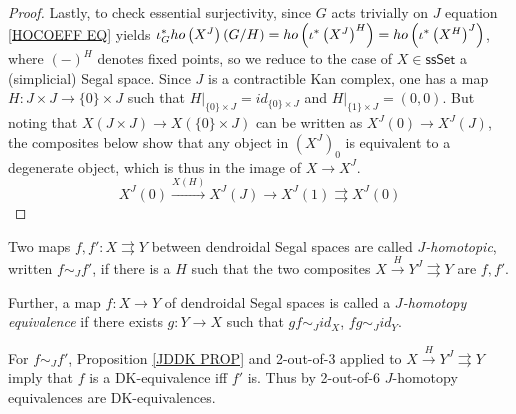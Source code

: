 \documentclass[a4paper,10pt
 ,draft
]{article}%
\begin{document}
\begin{proof}
Lastly, to check essential surjectivity, 
since $G$ acts trivially on $J$ equation \eqref{HOCOEFF EQ} yields
$\iota_G^{\**} ho\left( X^J \right)(G/H)=
ho\left(\iota^{\**}\left(X^J\right)^H\right)=
ho\left(\iota^{\**}\left(X^H\right)^J\right)$,
where $(-)^H$ denotes fixed points,
so we reduce to the case of $X \in \mathsf{ssSet}$ a (simplicial) Segal space.
Since $J$ is a contractible Kan complex,
one has a map 
$H \colon J \times J \to \{0\} \times J$
such that 
$H|_{\{0\}\times J} = id_{\{0\} \times J}$
and
$H|_{\{1\}\times J} = (0,0)$.
But noting that 
$X(J \times J) \to X(\{0\} \times J)$
can be written as 
$X^J(0) \to X^J(J)$, the composites below
show that any object in $\left(X^J\right)_0$ is equivalent to a 
degenerate object, which is thus in the image of $X\to X^J$.
\[
	X^J(0) \xrightarrow{X(H)} 
	X^{J}(J) \to
	X^J(1) \rightrightarrows X^J(0)
\]
%
\end{proof}


\begin{definition}
	Two maps $f,f'\colon X \rightrightarrows Y$ between dendroidal Segal spaces are called \textit{$J$-homotopic}, written $f \sim_J f'$, if
	there is a $H$ such that
	the two composites
	$X \xrightarrow{H} Y^J \rightrightarrows Y$
	are $f,f'$.
	
	Further, a map $f\colon X \to Y$ of dendroidal Segal spaces is called a \textit{$J$-homotopy equivalence} if there exists $g \colon Y \to X$
	such that $gf \sim_J id_X$, $fg \sim_J id_Y$.
\end{definition}


\begin{remark}
	For $f\sim_J f'$, Proposition \ref{JDDK PROP} and 2-out-of-3 applied to $X \xrightarrow{H} Y^J \rightrightarrows Y$ imply that $f$ is a DK-equivalence iff $f'$ is.
	Thus by 2-out-of-6 $J$-homotopy equivalences are DK-equivalences.
\end{remark}
\end{document}
